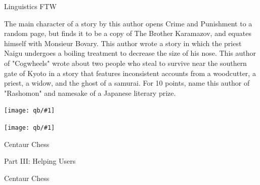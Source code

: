 \documentclass[xcolor=dvipsnames,xcolor=table]{beamer}
\newcommand{\fsi}[2]{
\begin{frame}[plain]
\vspace*{-1pt}
\makebox[\linewidth]{\texttt{[image: \#1]}}
\begin{center}
#2
\end{center}
\end{frame}
}
\newcommand{\gfxq}[2]{
\begin{center}
	\texttt{[image: qb/\#1]}
\end{center}
}
\begin{document}
\begin{frame}{Linguistics FTW}

  The main character of a story by \alert<2>{this author opens Crime and Punishment} to a
random page, but finds it to be a copy of The Brother Karamazov, and equates
himself with Monsieur Bovary. This author wrote a story in which the priest
Naigu undergoes a boiling treatment to decrease the size of his nose. This
author of "Cogwheels" wrote about two people who steal to survive near the
southern gate of Kyoto in a story that features inconsistent accounts from a
woodcutter, a priest, a widow, and the ghost of a samurai. For 10 points, name
this author of "Rashomon" and namesake of a Japanese literary prize. \\
\end{frame}



\begin{frame}[plain]
\gfxq{seattle_crowd}{.5}
\gfxq{chicago_crowd}{.5}
\end{frame}

\fsi{qb/boring_dot_products}{}

\fsi{simtrans/centaur-chess}{Centaur Chess}

\begin{frame}{}

  \huge Part III: Helping Users

\end{frame}

\fsi{simtrans/centaur-chess}{Centaur Chess}
\end{document}
